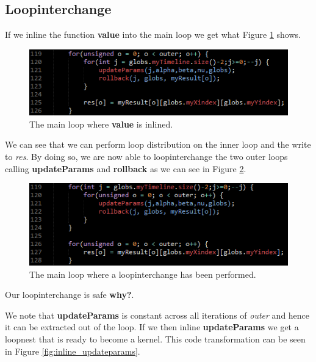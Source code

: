 \subsection{Loopinterchange}
If we inline the function \textbf{value} into the main loop we get what Figure
\ref{fig:inline_value} shows.

\begin{figure}[!ht]
	\centering
		\includegraphics[scale=0.8]{input/figures/inline_value.png}
		\caption{The main loop where \textbf{value} is inlined.\label{fig:inline_value}}
\end{figure}

We can see that we can perform loop distribution on the inner loop and the
write to \emph{res}. By doing so, we are now able to loopinterchange the two
outer loops calling \textbf{updateParams} and \textbf{rollback} as we can see in
Figure \ref{fig:main_loopinterchange}.

\begin{figure}[!ht]
	\centering
		\includegraphics[scale=0.8]{input/figures/main_loopinterchange.png}
		\caption{The main loop where a loopinterchange has been performed.\label{fig:main_loopinterchange}}
\end{figure}

Our loopinterchange is safe \textbf{why?}.

We note that \textbf{updateParams} is constant across all iterations of
\emph{outer} and hence it can be extracted out of the loop. If we then inline
\textbf{updateParams} we get a loopnest that is ready to become a kernel.
This code transformation can be seen in Figure \ref{fig:inline_updateparams}.

